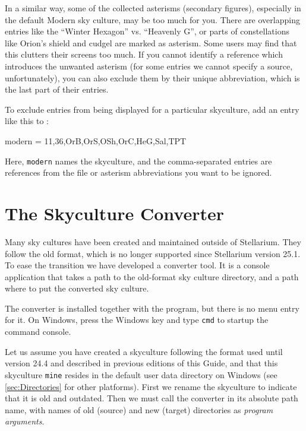 In a similar way, some of the collected asterisms (secondary figures), especially in the default Modern sky culture, may be too much for you. 
There are overlapping entries like the ``Winter Hexagon'' vs. ``Heavenly G'', 
or parts of constellations like Orion's shield and cudgel are marked as asterism. Some users may find that this clutters their screens too much. 
If you cannot identify a reference which introduces the unwanted asterism (for some entries we cannot specify a source, unfortunately), 
you can also exclude them by their unique abbreviation, which is the last part of their  entries.

To exclude entries from being displayed for a particular skyculture, add an entry like this to :
\begin{configfile}
[SCExcludeReferences]
modern  = 11,36,OrB,OrS,OSh,OrC,HeG,Sal,TPT
\end{configfile}
%
Here, \texttt{modern} names the skyculture, and the comma-separated entries are references from the file  or 
asterism abbreviations you want to be ignored.



\section{The Skyculture Converter}
\label{ch:SkyCultures:converter}

Many sky cultures have been created and maintained outside of Stellarium. They follow the old format, which is no longer supported since Stellarium version 25.1. 
To ease the transition we have developed a converter tool. It is a console application that takes a path to the old-format sky culture directory, 
and a path where to put the converted sky culture. 

The converter is installed together with the program, but there is no menu entry for it. 
On Windows, press the Windows key and type \texttt{cmd} to startup the command console. 

Let us assume you have created a skyculture following the format used until version 24.4 and described in previous editions of this Guide, 
and that this skyculture \texttt{mine} resides in the default user data directory on Windows (see \ref{sec:Directories} for other platforms). 
First we rename the skyculture to indicate that it is old and outdated. Then we must call the converter in its absolute path name, 
with names of old (source) and new (target) directories as \emph{program arguments}.

